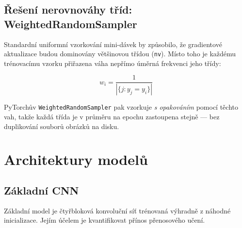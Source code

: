 \documentclass[12pt, a4paper]{article}
\begin{document}
\subsection{Řešení nerovnováhy tříd: WeightedRandomSampler}

Standardní uniformní vzorkování mini-dávek by způsobilo, že gradientové
aktualizace budou dominovány většinovou třídou (\texttt{nv}). Místo toho
je každému trénovacímu vzorku přiřazena váha nepřímo úměrná frekvenci
jeho třídy:

\begin{equation}
    w_i = \frac{1}{|\{j : y_j = y_i\}|}
    \label{eq:sample_weight}
\end{equation}

PyTorchův \texttt{WeightedRandomSampler} pak vzorkuje \textit{s opakováním}
pomocí těchto vah, takže každá třída je v průměru na epochu zastoupena
stejně --- bez duplikování souborů obrázků na disku.

\section{Architektury modelů}
\label{sec:models}

\subsection{Základní CNN}

Základní model je čtyřbloková konvoluční síť trénovaná výhradně z náhodné
inicializace. Jejím účelem je kvantifikovat přínos přenosového učení.
\end{document}
